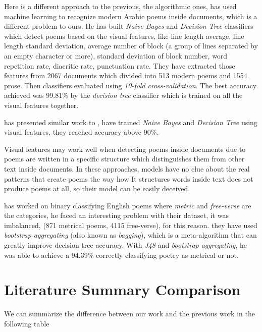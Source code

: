 Here is a different approach to the previous, the algorithmic ones, \cite{Almuhareb2015RecognitionModernArabicPoems} has used machine learning to recognize modern Arabic poems inside documents, which is a different problem to ours.  He has built \textit{Naive Bayes} and \textit{Decision Tree} classifiers which detect poems based on the visual features, like line length average, line length standard deviation, average number of block (a group of lines separated by an empty character or more), standard deviation of block number, word repetition rate, diacritic rate, punctuation rate. They have extracted those features from 2067 documents which divided into 513 modern poems and 1554 prose.  Then classifiers evaluated using \textit{10-fold cross-validation}. The best accuracy achieved was 99.81\%  by the \textit{decision tree} classifier which is trained on all the visual features together.

\cite{Tizhoosh2006PoemRecognition} has presented similar work to \cite{Almuhareb2015RecognitionModernArabicPoems}, have trained \textit{Naive Bayes} and \textit{Decision Tree} using visual features, they reached accuracy above 90\%.

Visual features may work well when detecting poems inside documents due to poems are written in a specific structure which distinguishes them from other text inside documents. In these approaches, models have no clue about the real patterns that create poems the way how It structures words inside text does not produce poems at all, so their model can be easily deceived.

\cite{Tanasescu2016AutomaticClassificationPoetryMeter} has worked on binary classifying English poems where \textit{metric} and \textit{free-verse} are the categories, he faced an interesting problem with their dataset, it was imbalanced, (871 metrical poems, 4115 free-verse), for this reason. they have used \textit{bootstrap aggregating} (also known as \textit{bagging}), which is a meta-algorithm that can greatly improve decision tree accuracy.  With \textit{J48} and \textit{bootstrap aggregating}, he was able to achieve a 94.39\% correctly classifying poetry as metrical or not.

\section{Literature Summary Comparison}

We can summarize the difference between our work and the previous work in the following table

